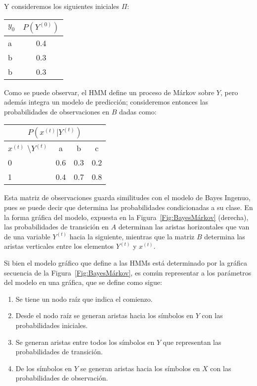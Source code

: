 Y consideremos los siguientes iniciales $\Pi$:

\begin{center}
 \begin{tabular}{l|c}
  \multicolumn{1}{c|}{$y_0$}   &  $P(Y^{(0)})$ \\ \hline
  a &    0.4 \\
  b   &    0.3 \\
  b    &    0.3
 \end{tabular}
 \end{center}

Como se puede observar, el HMM define un proceso de Márkov sobre $Y$, pero además integra un modelo de predicción; consideremos entonces las probabilidades de observaciones en $B$ dadas como:

\begin{center}
 \begin{tabular}{l|ccc}
  \multicolumn{4}{c}{$P(x^{(t)}|Y^{(t)})$} \\ \hline
  $x^{(t)}$ \textbackslash $Y^{(t)}$   & a & b & c \\ \hline
  0 &    0.6   &    0.3  & 0.2 \\
  1   &    0.4   &    0.7  & 0.8 
 \end{tabular}
 \end{center}

 Esta matriz de observaciones guarda similitudes con el modelo de Bayes Ingenuo, pues se puede decir que determina las probabilidades condicionadas a su clase. En la forma gráfica del modelo, expuesta en la Figura~\ref{Fig:BayesMárkov} (derecha), las probabilidades de transición en $A$ determinan las aristas horizontales que van de una variable $Y^{(t)}$ hacia la siguiente, mientras que la matriz $B$ determina las aristas verticales entre los elementos $Y^{(t)}$ y $x^{(t)}$.

 Si bien el modelo gráfico que define a las HMMs está determinado por la gráfica secuencia de la Figura~\ref{Fig:BayesMárkov}, es común representar a los parámetros del modelo en una gráfica, que se define como sigue:

 \begin{enumerate}
     \item Se tiene un nodo raíz que indica el comienzo.
     \item Desde el nodo raíz se generan aristas hacia los símbolos en $Y$ con las probabilidades iniciales.
     \item Se generan aristas entre todos los símbolos en $Y$ que representan las probabilidades de transición.
     \item De los símbolos en $Y$ se generan aristas hacia los símbolos en $X$ con las probabilidades de observación.
 \end{enumerate}

